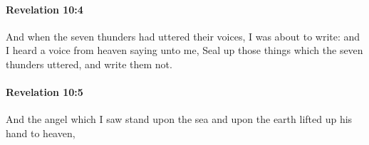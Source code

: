 		\paragraph{Revelation 10:4} %
			\label{REVELATIONNT-10-4}

			And when the seven thunders had uttered their voices, I was about to write: and I heard a voice from heaven saying unto me, Seal up those things which the seven thunders uttered, and write them not.

			\begin{framed}
			\scriptsize
				\begin{compactdesc}
					\item[SBLG] 
				\end{compactdesc}
			\end{framed}

		\paragraph{Revelation 10:5} %
			\label{REVELATIONNT-10-5}

			And the angel which I saw stand upon the sea and upon the earth lifted up his hand to heaven,

